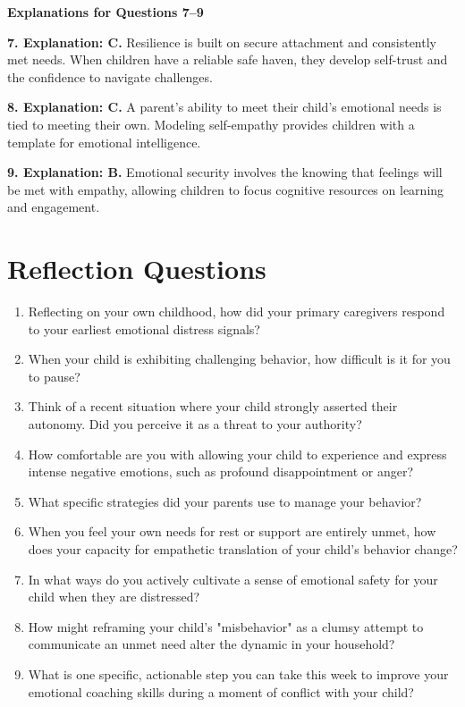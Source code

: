 \begin{practiceexercise}
\newpage

\textbf{Explanations for Questions 7--9}

  \textbf{7. Explanation: C.} Resilience is built on secure attachment and consistently met needs. When children have a reliable safe haven, they develop self-trust and the confidence to navigate challenges.

\textbf{8. Explanation: C.} A parent's ability to meet their child's emotional needs is tied to meeting their own. Modeling self-empathy provides children with a template for emotional intelligence.

\textbf{9. Explanation: B.} Emotional security involves the knowing that feelings will be met with empathy, allowing children to focus cognitive resources on learning and engagement.
\end{practiceexercise}

\newpage
\section{Reflection Questions}
\begin{reflection}
\begin{enumerate}[itemsep=0pt, parsep=0pt, topsep=0pt]
  \item Reflecting on your own childhood, how did your primary caregivers respond to your earliest emotional distress signals?
  \item When your child is exhibiting challenging behavior, how difficult is it for you to pause?
  \item Think of a recent situation where your child strongly asserted their autonomy. 
  Did you perceive it as a threat to your authority?
  \item How comfortable are you with allowing your child to experience and express intense negative emotions, such as profound disappointment or anger?
  \item What specific strategies did your parents use to manage your behavior?
  \item When you feel your own needs for rest or support are entirely unmet, how does your capacity for empathetic translation of your child's behavior change?
  \item In what ways do you actively cultivate a sense of emotional safety for your child when they are distressed?
  \item How might reframing your child's "misbehavior" as a clumsy attempt to communicate an unmet need alter the dynamic in your household?
  \item What is one specific, actionable step you can take this week to improve your emotional coaching skills during a moment of conflict with your child?
\end{enumerate}
\end{reflection}
